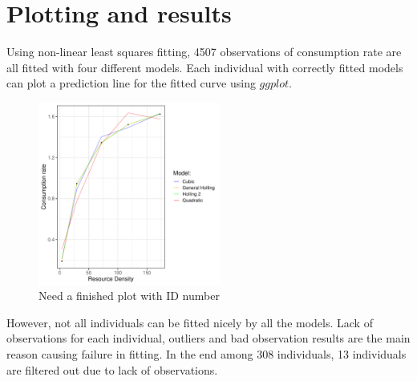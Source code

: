 \documentclass{article}[11pt,a4,twosided,doublespacing,titlepagenumber=on,numbers=endperiod]
\begin{document}
\newpage

\section{Plotting and results}
Using non-linear least squares fitting, 4507 observations of consumption rate are all fitted with four different models. Each individual with correctly fitted models can plot a prediction line for the fitted curve using $ggplot$.
\begin{figure}[H]
\centering
\includegraphics[height= 60mm]{../Results/plot/Functional_response_curve_40130.pdf}
\renewcommand\thefigure{\arabic{figure}}
\setcounter{figure}{0}
\caption{Need a finished plot with ID number}
\end{figure}
\noindent However, not all individuals can be fitted nicely by all the models. Lack of observations for each individual, outliers and bad observation results are the main reason causing failure in fitting. In the end among 308 individuals, 13 individuals are filtered out due to lack of observations. 
\end{document}

